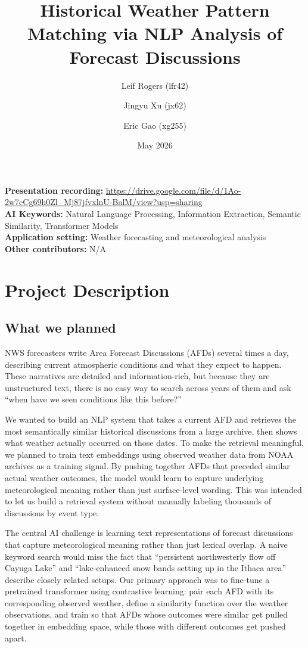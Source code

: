 \documentclass[11pt]{article}
\title{Historical Weather Pattern Matching via NLP Analysis of Forecast Discussions}
\author{
  Leif Rogers (lfr42) \and
  Jingyu Xu (jx62) \and
  Eric Gao (xg255)
}
\date{May 2026}
\begin{document}
\maketitle

\noindent\textbf{Presentation recording:} \url{https://drive.google.com/file/d/1Ao-2w7cCg69h0Zl_Mj87jfvxlnU-BalM/view?usp=sharing} \\
\textbf{AI Keywords:} Natural Language Processing, Information Extraction, Semantic Similarity, Transformer Models \\
\textbf{Application setting:} Weather forecasting and meteorological analysis \\
\textbf{Other contributors:} N/A

\section{Project Description}

\subsection{What we planned}

NWS forecasters write Area Forecast Discussions (AFDs) several times a day, describing current atmospheric conditions and what they expect to happen. These narratives are detailed and information-rich, but because they are unstructured text, there is no easy way to search across years of them and ask ``when have we seen conditions like this before?''

We wanted to build an NLP system that takes a current AFD and retrieves the most semantically similar historical discussions from a large archive, then shows what weather actually occurred on those dates. To make the retrieval meaningful, we planned to train text embeddings using observed weather data from NOAA archives as a training signal. By pushing together AFDs that preceded similar actual weather outcomes, the model would learn to capture underlying meteorological meaning rather than just surface-level wording. This was intended to let us build a retrieval system without manually labeling thousands of discussions by event type.

The central AI challenge is learning text representations of forecast discussions that capture meteorological meaning rather than just lexical overlap. A naive keyword search would miss the fact that ``persistent northwesterly flow off Cayuga Lake'' and ``lake-enhanced snow bands setting up in the Ithaca area'' describe closely related setups. Our primary approach was to fine-tune a pretrained transformer using contrastive learning: pair each AFD with its corresponding observed weather, define a similarity function over the weather observations, and train so that AFDs whose outcomes were similar get pulled together in embedding space, while those with different outcomes get pushed apart.
\end{document}
